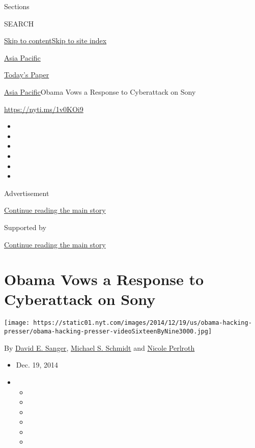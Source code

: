 Sections

SEARCH

\protect\hyperlink{site-content}{Skip to
content}\protect\hyperlink{site-index}{Skip to site index}

\href{https://www.nytimes.com/section/world/asia}{Asia Pacific}

\href{https://myaccount.nytimes.com/auth/login?response_type=cookie\&client_id=vi}{}

\href{https://www.nytimes.com/section/todayspaper}{Today's Paper}

\href{/section/world/asia}{Asia Pacific}\textbar{}Obama Vows a Response
to Cyberattack on Sony

\url{https://nyti.ms/1v0KOi9}

\begin{itemize}
\item
\item
\item
\item
\item
\item
\end{itemize}

Advertisement

\protect\hyperlink{after-top}{Continue reading the main story}

Supported by

\protect\hyperlink{after-sponsor}{Continue reading the main story}

\hypertarget{obama-vows-a-response-to-cyberattack-on-sony}{%
\section{Obama Vows a Response to Cyberattack on
Sony}\label{obama-vows-a-response-to-cyberattack-on-sony}}

\texttt{[image: https://static01.nyt.com/images/2014/12/19/us/obama-hacking-presser/obama-hacking-presser-videoSixteenByNine3000.jpg]}

By \href{http://www.nytimes.com/by/david-e-sanger}{David E. Sanger},
\href{http://www.nytimes.com/by/michael-s-schmidt}{Michael S. Schmidt}
and \href{http://www.nytimes.com/by/nicole-perlroth}{Nicole Perlroth}

\begin{itemize}
\item
  Dec. 19, 2014
\item
  \begin{itemize}
  \item
  \item
  \item
  \item
  \item
  \item
  \end{itemize}
\end{itemize}

